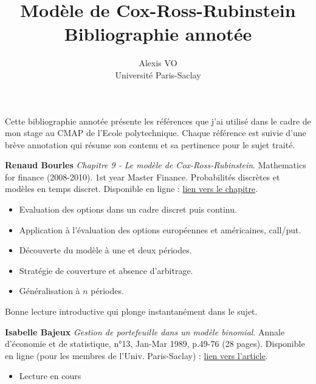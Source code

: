 \documentclass[11pt]{article}
\title{Modèle de Cox-Ross-Rubinstein\\\medskip Bibliographie annotée}
\author{Alexis VO\\Université Paris-Saclay}
\begin{document}
\maketitle

Cette bibliographie annotée présente les références que j'ai utilisé dans le cadre de mon stage au CMAP de l'Ecole polytechnique. Chaque référence est suivie d'une brève annotation qui résume son contenu et sa pertinence pour le sujet traité.

\vspace{1em}

\textbf{Renaud Bourles} \textit{Chapitre 9 - Le modèle de Cox-Ross-Rubinstein}. Mathematics for finance (2008-2010). 1st year Master Finance. Probabilités discrètes et modèles en temps discret.
Disponible en ligne : \href{http://renaud.bourles.perso.centrale-med.fr/MathsFi/Chap%209%20-%20Le%20modele%20Cox-Ross-Rubinstein.pdf}{lien vers le chapitre}.
\begin{itemize}
    \item Evaluation des options dans un cadre discret puis continu.
    \item Application à l'évaluation des options européennes et américaines, call/put.
    \item Découverte du modèle à une et deux périodes.
    \item Stratégie de couverture et absence d'arbitrage.
    \item Généralisation à $n$ périodes.
\end{itemize}
Bonne lecture introductive qui plonge instantanément dans le sujet.\\ 

\vspace{1em}

\textbf{Isabelle Bajeux} \textit{Gestion de portefeuille dans un modèle binomial}. Annale d'économie et de statistique, n°13, Jan-Mar 1989, p.49-76 (28 pages).
Disponible en ligne (pour les membres de l'Univ. Paris-Saclay) : \href{https://www.jstor.org/stable/20075729}{lien vers l'article}.
\begin{itemize}
    \item Lecture en cours
\end{itemize}
\end{document}
